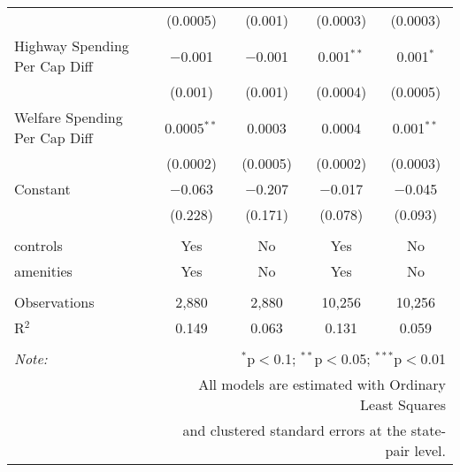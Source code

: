 \begin{table}[!htbp]
\begin{tabular}{@{\extracolsep{5pt}}lcccc}
  & (0.0005) & (0.001) & (0.0003) & (0.0003) \\ 
  Highway Spending Per Cap Diff & $-$0.001 & $-$0.001 & 0.001$^{**}$ & 0.001$^{*}$ \\ 
  & (0.001) & (0.001) & (0.0004) & (0.0005) \\ 
  Welfare Spending Per Cap Diff & 0.0005$^{**}$ & 0.0003 & 0.0004 & 0.001$^{**}$ \\ 
  & (0.0002) & (0.0005) & (0.0002) & (0.0003) \\ 
  Constant & $-$0.063 & $-$0.207 & $-$0.017 & $-$0.045 \\ 
  & (0.228) & (0.171) & (0.078) & (0.093) \\ 
 \hline \\[-1.8ex] 
controls & Yes & No & Yes & No \\ 
amenities & Yes & No & Yes & No \\ 
\hline \\[-1.8ex] 
Observations & 2,880 & 2,880 & 10,256 & 10,256 \\ 
R$^{2}$ & 0.149 & 0.063 & 0.131 & 0.059 \\ 
\hline 
\hline \\[-1.8ex] 
\textit{Note:}  & \multicolumn{4}{r}{$^{*}$p$<$0.1; $^{**}$p$<$0.05; $^{***}$p$<$0.01} \\ 
 & \multicolumn{4}{r}{All models are estimated with Ordinary Least Squares} \\ 
 & \multicolumn{4}{r}{and clustered standard errors at the state-pair level.} \\ 
\end{tabular} 
\end{table} 
